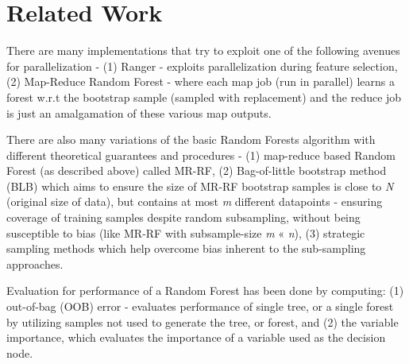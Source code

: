 \documentclass{sig-alternate-05-2015}
\begin{document}
\section{Related Work}
There are many implementations that try to exploit one of the following avenues for parallelization - (1) Ranger - exploits parallelization during feature selection, (2) Map-Reduce Random Forest - where each map job (run in parallel) learns a forest w.r.t the bootstrap sample (sampled with replacement) and the reduce job is just an amalgamation of these various map outputs.

There are also many variations of the basic Random Forests algorithm with different theoretical guarantees and procedures \cite{wright2015ranger,genuer2015random} - (1) map-reduce based Random Forest (as described above) called MR-RF, (2) Bag-of-little bootstrap method (BLB) which aims to ensure the size of MR-RF bootstrap samples is close to \textit{N} (original size of data), but contains at most \textit{m} different datapoints - ensuring coverage of training samples despite random subsampling, without being susceptible to bias (like MR-RF with subsample-size \textit{m} « \textit{n}), (3) strategic sampling methods which help overcome bias inherent to the sub-sampling approaches.

Evaluation for performance of a Random Forest has been done by computing: (1) out-of-bag (OOB) error - evaluates performance of single tree, or a single forest by utilizing samples not used to generate the tree, or forest, and (2) the variable importance, which evaluates the importance of a variable used as the decision node.
\end{document}
